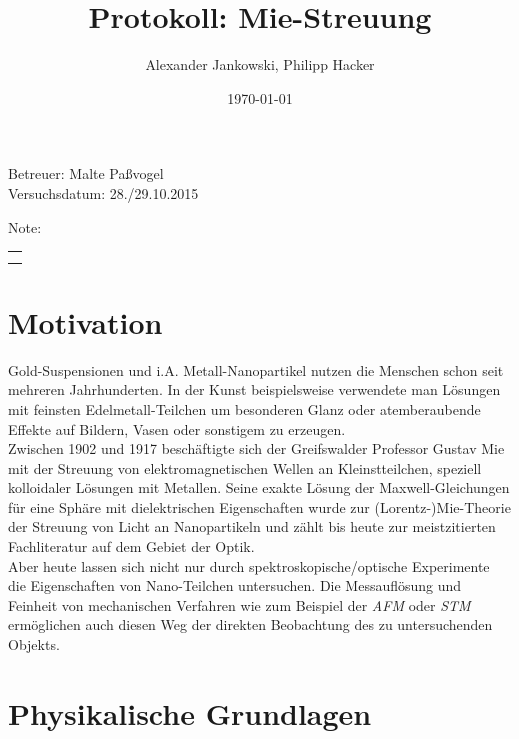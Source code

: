 \documentclass[numbers=noenddot,a4paper,notitlepage,twoside,BCOR15mm]{scrartcl}
\title{Protokoll: Mie-Streuung} %
\author{Alexander Jankowski, Philipp Hacker}
\date{\today}
\newcommand{\tilt}[1]{\textit{#1}}
\begin{document}
	\maketitle
	\begin{center}
		Betreuer: Malte Paßvogel\\ %
		Versuchsdatum: 28./29.10.2015\\ %
		\begin{table}[h]
			\centering
			Note: %
			\begin{tabularx}{1.5cm}{|X|}
				\hline \\ \\
				\hline
			\end{tabularx}
		\end{table}
	\end{center}
	\vspace*{\fill}
	\tableofcontents
	\vfill
	\newpage
	\section{Motivation}

		Gold-Suspensionen und i.A. Metall-Nanopartikel nutzen die Menschen schon seit mehreren Jahrhunderten. In der Kunst beispielsweise verwendete man Lösungen mit feinsten Edelmetall-Teilchen um besonderen Glanz oder atemberaubende Effekte auf Bildern, Vasen oder sonstigem zu erzeugen.\\
		Zwischen 1902 und 1917 beschäftigte sich der Greifswalder Professor Gustav Mie mit der Streuung von elektromagnetischen Wellen an Kleinstteilchen, speziell kolloidaler Lösungen mit Metallen. Seine exakte Lösung der Maxwell-Gleichungen für eine Sphäre mit dielektrischen Eigenschaften wurde zur (Lorentz-)Mie-Theorie der Streuung von Licht an Nanopartikeln und zählt bis heute zur meistzitierten Fachliteratur auf dem Gebiet der Optik.\\
		Aber heute lassen sich nicht nur durch spektroskopische/optische Experimente die Eigenschaften von Nano-Teilchen untersuchen. Die Messauflösung und Feinheit von mechanischen Verfahren wie zum Beispiel der \tilt{AFM} oder \tilt{STM} ermöglichen auch diesen Weg der direkten Beobachtung des zu untersuchenden Objekts.

	\newpage
	\section{Physikalische Grundlagen}
\end{document}
